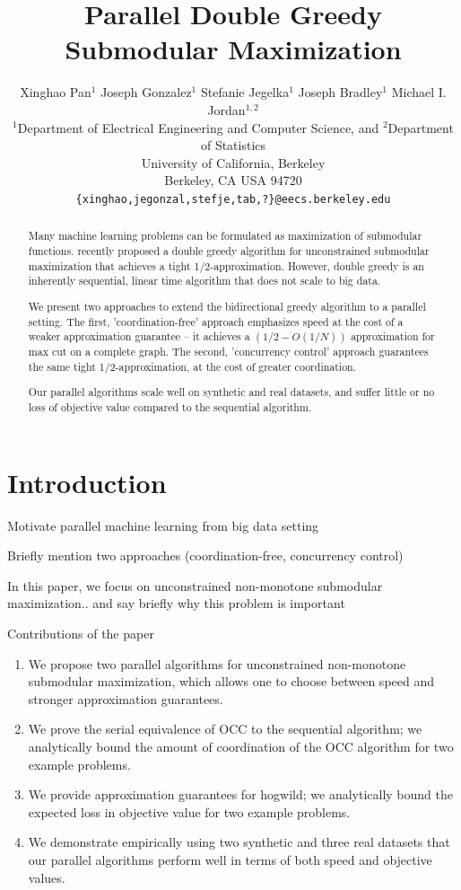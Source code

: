 \documentclass{article} %
\title{Parallel Double Greedy Submodular Maximization}
\author{
Xinghao Pan$^1$ Joseph Gonzalez$^1$ Stefanie Jegelka$^1$ Joseph Bradley$^{1}$ Michael I. Jordan$^{1,2}$\\
$^1$Department of Electrical Engineering and Computer Science, and $^2$Department of Statistics\\
University of California, Berkeley\\
Berkeley, CA USA 94720\\
  \texttt{\{xinghao,jegonzal,stefje,tab,?\}@eecs.berkeley.edu} \\
}
\begin{document}
\maketitle


\begin{abstract}
Many machine learning problems can be formulated as maximization of submodular functions. \cite{buchbinder2012} recently proposed a double greedy algorithm for unconstrained submodular maximization that achieves a tight 1/2-approximation. However, double greedy is an inherently sequential, linear time algorithm that does not scale to big data. 

We present two approaches to extend the bidirectional greedy algorithm to a parallel setting. The first, 'coordination-free' approach emphasizes speed at the cost of a weaker approximation guarantee -- it achieves a $(1/2 - O(1/N))$ approximation for max cut on a complete graph.
The second, 'concurrency control' approach guarantees the same tight 1/2-approximation, at the cost of greater coordination.

Our parallel algorithms scale well on synthetic and real datasets, and suffer little or no loss of objective value compared to the sequential algorithm.
\end{abstract}

\section{Introduction}


Motivate parallel machine learning from big data setting

Briefly mention two approaches (coordination-free, concurrency control)

In this paper, we focus on unconstrained non-monotone submodular maximization.. and say briefly why this problem is important

Contributions of the paper
\begin{enumerate}
\item We propose two parallel algorithms for unconstrained non-monotone submodular maximization, which allows one to choose between speed and stronger approximation guarantees.
\item We prove the serial equivalence of OCC to the sequential algorithm; we analytically bound the amount of coordination of the OCC algorithm for two example problems.
\item We provide approximation guarantees for hogwild; we analytically bound the expected loss in objective value for two example problems.
\item We demonstrate empirically using two synthetic and three real datasets that our parallel algorithms perform well in terms of both speed and objective values.
\end{enumerate}
\end{document}
